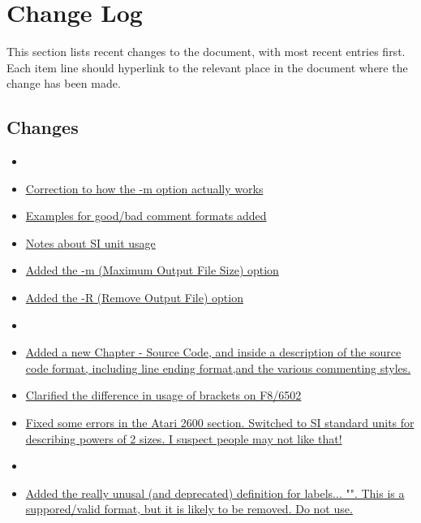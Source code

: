 \section*{Change Log}
\label{section:changelog}

This section lists recent changes to the document, with most recent entries first. Each item line should hyperlink to the relevant place in the document where the change has been made.

\subsection*{Changes}

\begin{itemize}

\item[]
\item \hyperref[changelog:20200908optionm]{Correction to how the -m option actually works}
\item \hyperref[changelog:20200909comment]{Examples for good/bad comment formats added}
\item \hyperref[changelog:20200909SI]{Notes about SI unit usage}
\item \hyperref[flag:maximum]{Added the -m (Maximum Output File Size) option}
\item \hyperref[flag:remove]{Added the -R (Remove Output File) option}

\item[]
\item \hyperref[changelog:20200908source]{Added a new Chapter - Source Code, and inside a description of the source code format, including line ending format,and  the various commenting styles.}
\item \hyperref[changelog:20200908brackets]{Clarified the difference in usage of brackets on F8/6502}
\item \hyperref[changelog:20200908atari]{Fixed some errors in the Atari 2600 section. Switched to SI standard units for describing powers of 2 sizes. I suspect people may not like that!}

\item[]
\item \hyperref[changelog:20200907deprecated]{Added the really unusal (and deprecated) definition for labels... "". This is a suppored/valid format, but it is likely to be removed. Do not use.}


\end{itemize}
